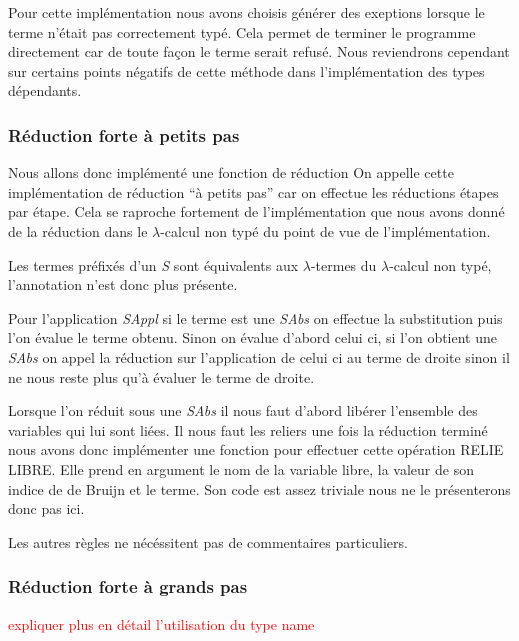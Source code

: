 \documentclass {article}
\newcommand{\codefrom}[3]
           {}
\theoremstyle{definition}
\theoremstyle{remark}
\newcommand{\todo}[1]{\textcolor{red}{#1}}
\begin{document}
Pour cette implémentation nous avons choisis générer des exeptions lorsque le terme
n'était pas correctement typé. Cela permet de terminer le programme directement car de toute
façon le terme serait refusé. Nous reviendrons cependant sur certains points négatifs de cette
méthode dans l'implémentation des types dépendants.


\subsubsection{Réduction forte à petits pas}
\label{reduction_petits_pas}


Nous allons donc implémenté une fonction de réduction 
On appelle cette implémentation de réduction ``à petits pas'' car 
on effectue les réductions étapes par étape. Cela se raproche fortement 
de l'implémentation que nous avons donné de la réduction dans le $\lambda$-calcul
non typé du point de vue de l'implémentation.

Les termes préfixés d'un \emph{S} sont équivalents aux $\lambda$-termes 
du $\lambda$-calcul non typé, l'annotation n'est donc plus présente.

\codefrom{typed}{lambda}{reduction_forte}

Pour l'application \emph{SAppl} si le terme est une \emph{SAbs} on 
effectue la substitution puis l'on évalue le terme obtenu.
Sinon on évalue d'abord celui ci, si l'on obtient une \emph{SAbs} 
on appel la réduction sur l'application de celui ci au terme de droite
sinon il ne nous reste plus qu'à évaluer le terme de droite.

Lorsque l'on réduit sous une \emph{SAbs} il nous faut d'abord libérer l'ensemble des
variables qui lui sont liées. Il nous faut les reliers une fois la réduction terminé 
nous avons donc implémenter une fonction pour effectuer cette opération RELIE LIBRE. %
Elle prend en argument le nom de la variable libre, la valeur de son indice de de Bruijn 
et le terme. Son code est assez triviale nous ne le présenterons donc pas ici.

Les autres règles ne nécéssitent pas de commentaires particuliers.

\subsubsection{Réduction forte à grands pas}

\todo{expliquer plus en détail l'utilisation du type name}
\end{document}
